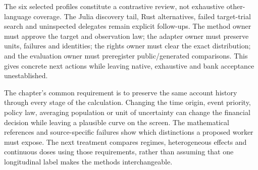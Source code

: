 The six selected profiles constitute a contrastive review, not exhaustive
other-language coverage. The Julia discovery tail, Rust alternatives, failed
target-trial search and uninspected delegates remain explicit follow-ups. The method
owner must approve the target and observation law; the adapter owner must preserve
units, failures and identities; the rights owner must clear the exact distribution;
and the evaluation owner must preregister public/generated comparisons. This gives
concrete next actions while leaving native, exhaustive and bank acceptance unestablished.


The chapter's common requirement is to preserve the same account history
through every stage of the calculation. Changing the time origin, event
priority, policy law, averaging population or unit of uncertainty can change
the financial decision while leaving a plausible curve on the screen. The
mathematical references and source-specific failures show which distinctions
a proposed worker must expose. The next treatment compares regimes,
heterogeneous effects and continuous doses using those requirements, rather
than assuming that one longitudinal label makes the methods interchangeable.

